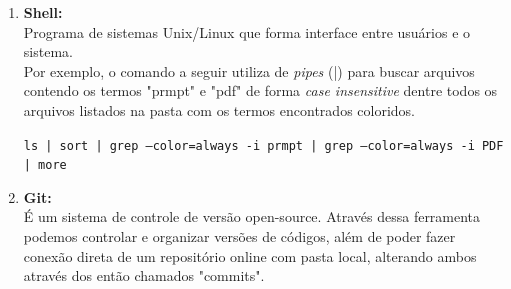 \documentclass[12pt]{article}
\begin{document}
    \begin{enumerate}[label=\bf{\Roman*}.]
        \item \textbf{Shell:} \\
        Programa de sistemas Unix/Linux que forma interface entre usuários e o sistema. \\
        Por exemplo, o comando a seguir utiliza de \textit{pipes} (|) para buscar arquivos contendo os termos "prmpt" e "pdf" de forma \textit{case insensitive} dentre todos os arquivos listados na pasta com os termos encontrados coloridos.
        
        \texttt{ls | sort | grep --color=always -i prmpt | grep --color=always -i PDF | more}

        \item \textbf{Git:} \\
        É um sistema de controle de versão open-source. Através dessa ferramenta podemos controlar e organizar versões de códigos, além de poder fazer conexão direta de um repositório online com pasta local, alterando ambos através dos então chamados "commits".


\end{enumerate}
\end{document}
